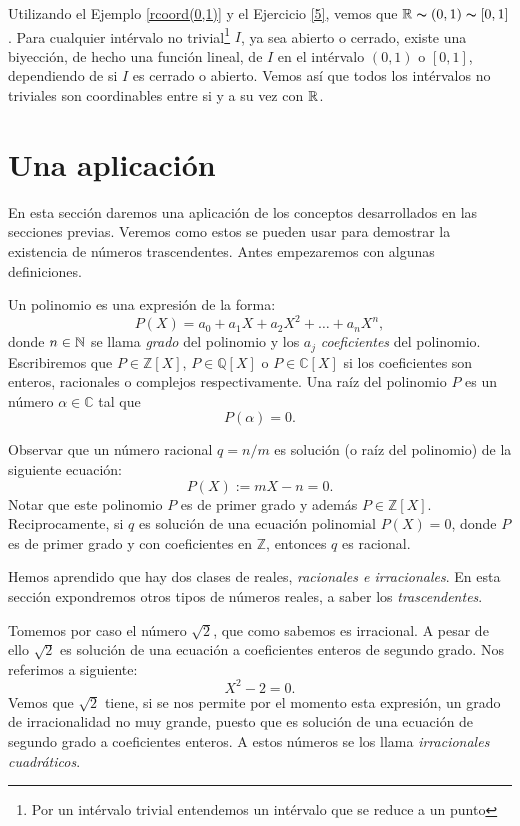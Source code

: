 Utilizando el Ejemplo \vref{rcoord(0,1)} y el Ejercicio \vref{5},
vemos que $\mathbb{R}\thicksim (0,1)\thicksim [0,1]$. Para cualquier
intérvalo no trivial\footnote{Por un intérvalo trivial
entendemos un intérvalo que se reduce a un punto} $I$,  ya sea
abierto o cerrado, existe una biyección, de hecho una función
lineal, de $I$ en el intérvalo $(0,1)$ o $[0,1]$, dependiendo de
si $I$ es cerrado o abierto. Vemos así que todos los
intérvalos no triviales son coordinables entre si y a su vez
con $\mathbb{R}$.



\section{Una aplicación}
En esta sección daremos una aplicación de los conceptos
desarrollados en las secciones previas. Veremos como estos se
pueden usar para demostrar la existencia de números
trascendentes. Antes empezaremos con algunas definiciones.

Un polinomio es una expresión de la forma:
\[P(X)=a_0+a_1X+a_2X^2+\dots+a_nX^n,\]
donde $n\in\mathbb{N}$ se llama \emph{grado} del polinomio y los $a_j$
\emph{coeficientes} del polinomio.  Escribiremos que $P\in
\mathbb{Z}[X]$, $P\in\mathbb{Q}[X]$ o $P\in\mathbb{C}[X]$ si los
coeficientes son enteros, racionales o complejos respectivamente.
Una raíz del polinomio $P$ es un número
$\alpha\in\mathbb{C}$ tal que
\[P(\alpha)=0.\]

Observar que un número racional $q=n/m$ es solución (o
raíz del polinomio) de la siguiente ecuación:
\[P(X):=mX-n=0.\]
Notar que este polinomio $P$ es de primer grado y además
$P\in\mathbb{Z}[X]$. Reciprocamente, si $q$ es solución de una
ecuación polinomial $P(X)=0$, donde $P$ es de primer grado y con
coeficientes en $\mathbb{Z}$, entonces $q$ es racional.

Hemos aprendido que hay dos clases de reales, \emph{racionales e
irracionales}. En esta sección expondremos otros tipos de
números reales, a saber los \emph{trascendentes}. 


Tomemos por caso el
número $\sqrt{2}$, que como sabemos es irracional. A pesar de
ello $\sqrt{2}$ es solución de una ecuación a coeficientes
enteros de  segundo grado. Nos referimos a
siguiente:
\[X^2-2=0.\]
Vemos que $\sqrt{2}$ tiene, si se nos permite por el momento esta
expresión, un grado de irracionalidad no muy grande, puesto
que es solución de una ecuación de segundo grado a
coeficientes enteros. A estos números se los llama  \emph{irracionales cuadráticos}.

